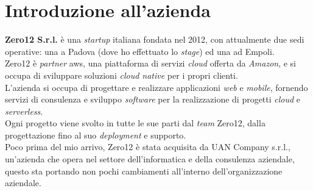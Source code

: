 \section{Introduzione all'azienda}
\label{sez:introduzione-azienda}

\textbf{Zero12 S.r.l.} è una \textit{startup} italiana fondata nel 2012, con attualmente due sedi operative: una a Padova (dove ho effettuato lo \textit{stage}) ed una ad Empoli.\\
Zero12 è \textit{partner} \gls{aws}, una piattaforma di servizi \textit{cloud} offerta da \textit{Amazon}, e si occupa di sviluppare soluzioni \textit{cloud native} per i propri clienti.\\
L'azienda si occupa di progettare e realizzare applicazioni \textit{web} e \textit{mobile}, fornendo servizi di consulenza e sviluppo \textit{software} per la realizzazione di progetti \textit{cloud} e \textit{serverless}.\\
Ogni progetto viene svolto in tutte le sue parti dal \textit{team} Zero12, dalla progettazione fino al suo \textit{deployment} e supporto.\\
Poco prima del mio arrivo, Zero12 è stata acquisita da UAN Company s.r.l., un'azienda che opera nel settore dell'informatica e della consulenza aziendale, 
questo sta portando non pochi cambiamenti all'interno dell'organizzazione aziendale.\\